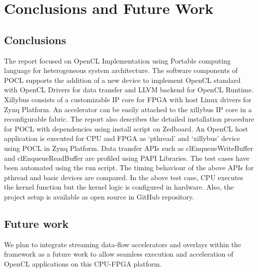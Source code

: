 \chapter{Conclusions and Future Work}
\label{ch6_Conclusions_and_Future_Work}

\section{Conclusions}
The report focused on OpenCL Implementation using Portable computing language for heterogeneous system architecture. The software components of POCL supports the addition of a new device to implement OpenCL standard with OpenCL Drivers for data transfer and LLVM backend for OpenCL Runtime. Xillybus consists of a customizable IP core for FPGA with host Linux drivers for Zynq Platform. An accelerator can be easily attached to the xillybus IP core in a reconfigurable fabric.
The report also describes the detailed installation procedure for POCL with dependencies using install script on Zedboard. An OpenCL host application is executed for CPU and FPGA as ‘pthread’ and ‘xillybus’ device using POCL in Zynq Platform. Data transfer APIs such as clEnqueueWriteBuffer and clEnqueueReadBuffer are profiled using PAPI Libraries. The test cases have been automated using the run script. The timing behaviour of the above APIs for pthread and basic devices are compared. In the above test case, CPU executes the kernel function but the kernel logic is configured in hardware. 
Also, the project setup is available as open source in GitHub repository.

\section{Future work}
We plan to integrate streaming data-flow accelerators and overlays within the framework as a future work to allow seamless execution and acceleration of OpenCL applications on this CPU-FPGA platform.